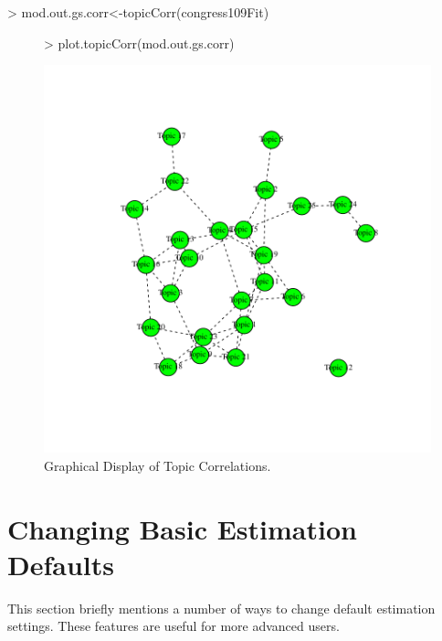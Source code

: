 \documentclass[nojss]{jss}
\begin{document}
\begin{Schunk}
\begin{Sinput}
> mod.out.gs.corr<-topicCorr(congress109Fit)
\end{Sinput}
\end{Schunk}

\begin{figure}[t!]
\begin{center}
\begin{Schunk}
\begin{Sinput}
> plot.topicCorr(mod.out.gs.corr)
\end{Sinput}
\end{Schunk}
\includegraphics{stmVignette-021}
\caption{Graphical Display of Topic Correlations.}
\label{fig:correlations}
\end{center}
\end{figure}





\section{Changing Basic Estimation Defaults}

This section briefly mentions a number of ways to change default estimation settings. These features are useful for more advanced users.
\end{document}
